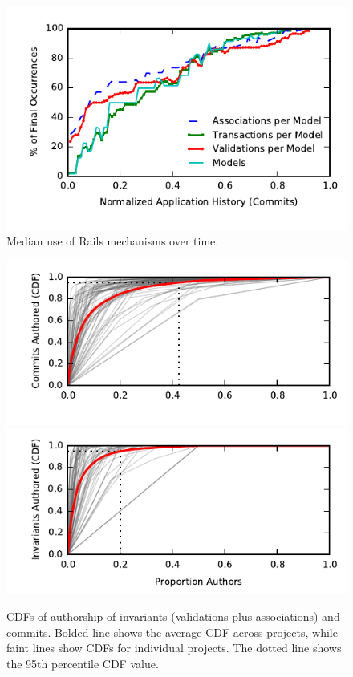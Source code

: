 
\appendix



\begin{figure}
\includegraphics[width=\columnwidth]{figs/historical-median.pdf}\vspace{-2em}
\caption{Median use of Rails mechanisms over time.}
\label{fig:historical}
\end{figure}


\begin{figure}
  \newcommand{\skipht}{\\[-2em]}
\includegraphics[width=\columnwidth]{figs/commit-authorship-cdf.pdf}\vspace{-2em}
\includegraphics[width=\columnwidth]{figs/invariant-authorship-cdf.pdf}\vspace{-1em}
\caption{CDFs of authorship of invariants (validations plus
  associations) and commits. Bolded line
  shows the average CDF across projects, while faint lines show CDFs
  for individual projects. The dotted line shows the 95th percentile
  CDF value. }
\label{fig:cdfs}
\end{figure}

